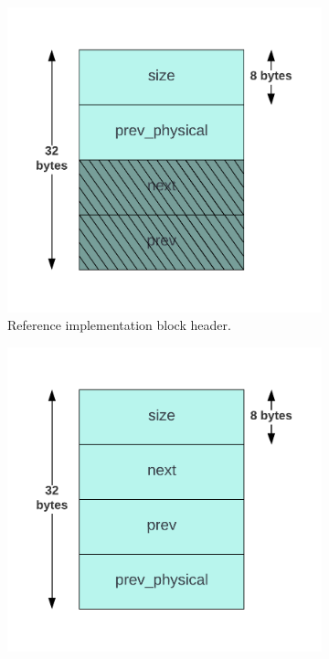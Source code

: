 
\begin{figure}[H]
    \centering
    \begin{subfigure}[b]{0.3\textwidth}
        \centering
        \includegraphics[width=\textwidth]{figures/blockheader_adap_reference.png}
        \caption{Reference implementation block header.}
        \label{fig:blockheader_adap_reference}
    \end{subfigure}%
    \hfill
    \begin{subfigure}[b]{0.3\textwidth}
        \centering
        \includegraphics[width=\textwidth]{figures/blockheader_adap_general.png}

\end{subfigure}
\end{figure}
